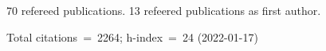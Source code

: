 70 refereed publications. 13 refeered publications as first author.

Total citations~=~2264; h-index~=~24 (2022-01-17)